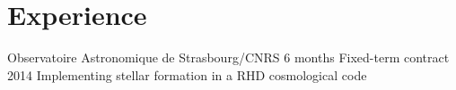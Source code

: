 \documentclass[11pt,a4paper,sans]{moderncv}
\newcommand{\aton}{{\texttt{ATON}}}
\begin{document}
\section{Experience}

\cventry
{Observatoire Astronomique de Strasbourg/CNRS}
{6 months}
{Fixed-term contract}
{2014}
{}
{}
{Implementing stellar formation in a RHD cosmological code}








\end{document}
